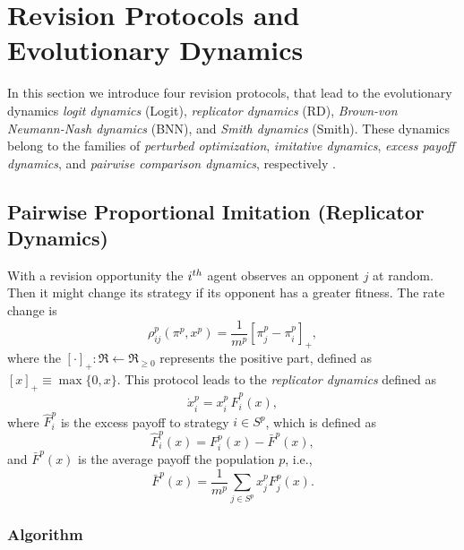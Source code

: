  
 
\section{Revision Protocols and Evolutionary Dynamics}\label{sec:protocols}
 
 
In this section we introduce four revision protocols, that lead to the evolutionary dynamics \emph{logit dynamics} (Logit), \emph{replicator dynamics} (RD), \emph{Brown-von Neumann-Nash dynamics} (BNN), and \emph{Smith dynamics} (Smith). These dynamics belong to the families of \emph{perturbed optimization}, \emph{imitative dynamics}, \emph{excess payoff dynamics}, and \emph{pairwise comparison dynamics}, respectively \cite{hofbauer2001nash, sandholm_book}. 
 
 
 
 
 
 
 \subsection{Pairwise Proportional Imitation (Replicator Dynamics)}

With a revision opportunity the $i^{th}$ agent observes an opponent $j$ at random. Then it might change its strategy if  its opponent has a greater fitness. The rate change is 
%
\begin{equation}
\rho_{ij}^p(\pi^p, x^p) = \frac{1}{m^p} [\pi_j^p - \pi_i^p]_+,
\end{equation}
where the $[\cdot]_+:\Re \leftarrow \Re_{\geq0}$ represents the positive part, defined as $[ x ]_+ \equiv \max\{ 0, x \}$.
This protocol leads to the \emph{replicator dynamics} defined as
\begin{equation}\label{eq:replicator}
\dot{x}_i^p = x_i^p \, \hat{F}_i^p \left( x \right),
\end{equation}
where $\hat{F}_i^p$ is the excess payoff to strategy $i\in S^p$, which is defined as   
\begin{equation}
\hat{F}_i^p (x) =  F_i^p(x) - \bar{F}^p(x),
\end{equation}
and $\bar{F}^p(x)$ is the average payoff the population $p$, i.e., 
\begin{equation}
 \bar{F}^p(x) = \frac{1}{m^p} \sum_{j \in S^p} x_j^p F_j^p(x).
\end{equation}



\subsubsection*{Algorithm}

